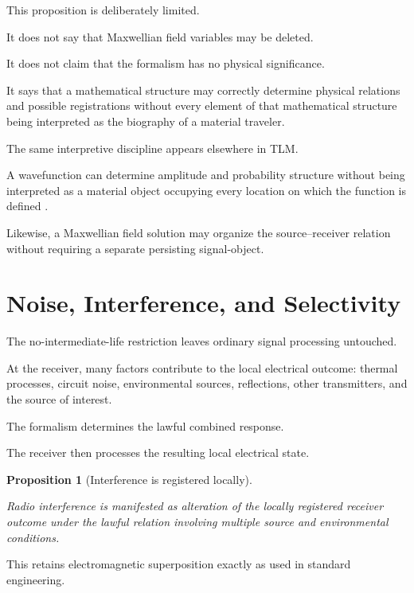 \documentclass[12pt,onecolumn]{article}
\newtheorem{proposition}{Proposition}[section]
\begin{document}
This proposition is deliberately limited.

It does not say that Maxwellian field variables may be deleted.

It does not claim that the formalism has no physical significance.

It says that a mathematical structure may correctly determine physical
relations and possible registrations without every element of that
mathematical structure being interpreted as the biography of a material
traveler.

The same interpretive discipline appears elsewhere in TLM.

A wavefunction can determine amplitude and probability structure without
being interpreted as a material object occupying every location on which
the function is defined \cite{wavefunctionnogo}.

Likewise, a Maxwellian field solution may organize the source--receiver
relation without requiring a separate persisting signal-object.

\section{Noise, Interference, and Selectivity}

The no-intermediate-life restriction leaves ordinary signal processing
untouched.

At the receiver, many factors contribute to the local electrical outcome:
thermal processes, circuit noise, environmental sources, reflections,
other transmitters, and the source of interest.

The formalism determines the lawful combined response.

The receiver then processes the resulting local electrical state.

\begin{proposition}[Interference is registered locally]
\label{prop:interference}

Radio interference is manifested as alteration of the locally registered
receiver outcome under the lawful relation involving multiple source and
environmental conditions.

\end{proposition}

This retains electromagnetic superposition exactly as used in standard
engineering.
\end{document}

